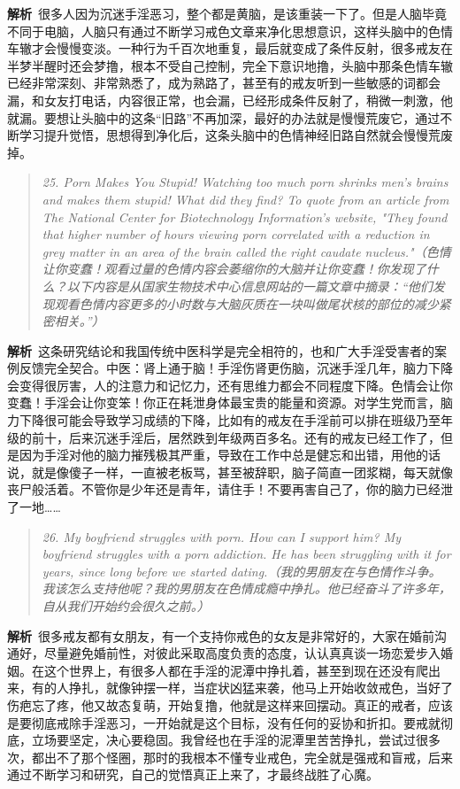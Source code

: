 \textbf{解析}\ 很多人因为沉迷手淫恶习，整个都是黄脑，是该重装一下了。但是人脑毕竟不同于电脑，人脑只有通过不断学习戒色文章来净化思想意识，这样头脑中的色情车辙才会慢慢变淡。一种行为千百次地重复，最后就变成了条件反射，很多戒友在半梦半醒时还会梦撸，根本不受自己控制，完全下意识地撸，头脑中那条色情车辙已经非常深刻、非常熟悉了，成为熟路了，甚至有的戒友听到一些敏感的词都会漏，和女友打电话，内容很正常，也会漏，已经形成条件反射了，稍微一刺激，他就漏。要想让头脑中的这条“旧路”不再加深，最好的办法就是慢慢荒废它，通过不断学习提升觉悟，思想得到净化后，这条头脑中的色情神经旧路自然就会慢慢荒废掉。

\begin{quote}\it
    25. Porn Makes You Stupid! Watching too much porn shrinks men’s brains and makes them stupid! What did they find? To quote from an article from The National Center for Biotechnology Information's website, "They found that higher number of hours viewing porn correlated with a reduction in grey matter in an area of the brain called the right caudate nucleus."（色情让你变蠢！观看过量的色情内容会萎缩你的大脑并让你变蠢！你发现了什么？以下内容是从国家生物技术中心信息网站的一篇文章中摘录：“他们发现观看色情内容更多的小时数与大脑灰质在一块叫做尾状核的部位的减少紧密相关。”）
\end{quote}

\textbf{解析}\ 这条研究结论和我国传统中医科学是完全相符的，也和广大手淫受害者的案例反馈完全契合。中医：肾上通于脑！手淫伤肾更伤脑，沉迷手淫几年，脑力下降会变得很厉害，人的注意力和记忆力，还有思维力都会不同程度下降。色情会让你变蠢！手淫会让你变笨！你正在耗泄身体最宝贵的能量和资源。对学生党而言，脑力下降很可能会导致学习成绩的下降，比如有的戒友在手淫前可以排在班级乃至年级的前十，后来沉迷手淫后，居然跌到年级两百多名。还有的戒友已经工作了，但是因为手淫对他的脑力摧残极其严重，导致在工作中总是健忘和出错，用他的话说，就是像傻子一样，一直被老板骂，甚至被辞职，脑子简直一团浆糊，每天就像丧尸般活着。不管你是少年还是青年，请住手！不要再害自己了，你的脑力已经泄了一地……

\begin{quote}\it
    26. My boyfriend struggles with porn. How can I support him? My boyfriend struggles with a porn addiction. He has been struggling with it for years, since long before we started dating.（我的男朋友在与色情作斗争。我该怎么支持他呢？我的男朋友在色情成瘾中挣扎。他已经奋斗了许多年，自从我们开始约会很久之前。）
\end{quote}

\textbf{解析}\ 很多戒友都有女朋友，有一个支持你戒色的女友是非常好的，大家在婚前沟通好，尽量避免婚前性，对彼此采取高度负责的态度，认认真真谈一场恋爱步入婚姻。在这个世界上，有很多人都在手淫的泥潭中挣扎着，甚至到现在还没有爬出来，有的人挣扎，就像钟摆一样，当症状凶猛来袭，他马上开始收敛戒色，当好了伤疤忘了疼，他又故态复萌，开始复撸，他就是这样来回摆动。真正的戒者，应该是要彻底戒除手淫恶习，一开始就是这个目标，没有任何的妥协和折扣。要戒就彻底，立场要坚定，决心要稳固。我曾经也在手淫的泥潭里苦苦挣扎，尝试过很多次，都出不了那个怪圈，那时的我根本不懂专业戒色，完全就是强戒和盲戒，后来通过不断学习和研究，自己的觉悟真正上来了，才最终战胜了心魔。

